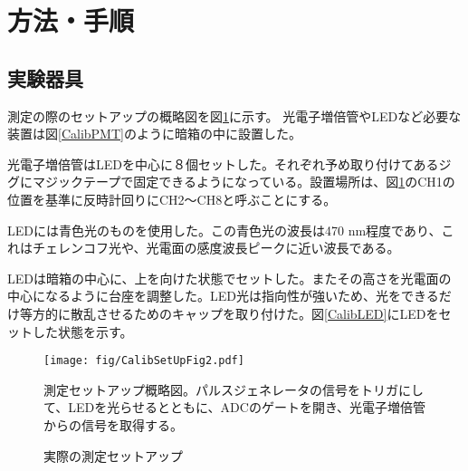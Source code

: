 \documentclass[11pt]{jreport}
\newcommand{\figref}[1]{図\ref{#1}}
\begin{document}
\section{方法・手順}
\subsection{実験器具}
測定の際のセットアップの概略図を\figref{CalibSetUpFig}に示す。
光電子増倍管やLEDなど必要な装置は\figref{CalibPMT}のように暗箱の中に設置した。

光電子増倍管はLEDを中心に８個セットした。それぞれ予め取り付けてあるジグにマジックテープで固定できるようになっている。設置場所は、\figref{CalibSetUpFig}のCH1の位置を基準に反時計回りにCH2〜CH8と呼ぶことにする。

LEDには青色光のものを使用した。この青色光の波長は470 nm程度であり、これはチェレンコフ光や、光電面の感度波長ピークに近い波長である。

LEDは暗箱の中心に、上を向けた状態でセットした。またその高さを光電面の中心になるように台座を調整した。LED光は指向性が強いため、光をできるだけ等方的に散乱させるためのキャップを取り付けた。\figref{CalibLED}にLEDをセットした状態を示す。

\begin{figure}[htbp]
\centering
\texttt{[image: fig/CalibSetUpFig2.pdf]}
\caption[測定セットアップ概略図]{測定セットアップ概略図。パルスジェネレータの信号をトリガにして、LEDを光らせるとともに、ADCのゲートを開き、光電子増倍管からの信号を取得する。}
\label{CalibSetUpFig}
\end{figure}

\begin{figure}[!htbp]
  \begin{minipage}{0.47\textwidth}
  \end{minipage}
  \hfill
  \begin{minipage}{0.47\textwidth}
  \end{minipage}
    \caption{実際の測定セットアップ}
  \label{CalibSetUpPic}
\end{figure}
\end{document}
